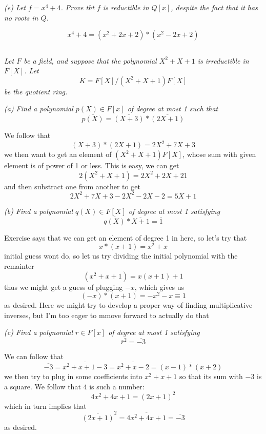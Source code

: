 \documentclass[11pt,oneside,titlepage]{book}
\begin{document}
\textit{(e) Let $f = x^4 + 4$. Prove tht $f$ is reductible in $Q[x]$,
  despite the fact that it has no roots in $Q$.}

$$x^4 + 4 = (x^2 + 2x + 2) * (x^2 - 2x + 2)$$

\subsection{}

\textit{Let $F$ be a field, and suppose that the polynomial $X^2 + X
  + 1$ is irreductible in $F[X]$. Let
  $$K = F[X] / (X^2 + X + 1)F[X]$$
  be the quotient ring.}

\textit{(a) Find a polynomial $p(X) \in F[x]$ of degree at most 1 such that
  $$\overline{p(X)} = \overline{(X + 3)} * \overline{(2X + 1)}$$
}

We follow that
$$(X + 3) * (2X + 1) = 2X^2 + 7X + 3$$
we then want to get an element of $(X^2 + X + 1)F[X]$,
whose sum with given element is of power of 1 or less. This is easy,
we can get
$$2(X^2 + X + 1) = 2X^2 + 2X + 21$$
and then substract one from another to get
$$2X^2 + 7X + 3 - 2X^2 - 2X - 2 = 5X + 1$$

\textit{(b) Find a polynomial $q(X) \in F[X]$ of degree at most 1 satisfying
  $$\overline{q(X)} * \overline{X + 1} = \overline{1}$$
}

Exercise says that we can get an element of degree 1 in here, so let's
try that
$$x * (x + 1) = x^2  + x$$
initial guess wont do, so let us try dividing the initial polynomial
with the remainter
$$(x^2 + x + 1) = x(x + 1) + 1$$
thus we might get a guess of plugging $-x$, which gives us
$$(-x) * (x + 1) = -x^2 - x \equiv 1$$
as desired. Here we might try to develop a proper way of finding
multiplicative inverses, but I'm too eager to mmove forward to
actually do that


\textit{(c) Find a polynomial $r \in F[x]$ of degree at most 1 satisfying
  $$\overline{r}^2 = \overline{- 3}$$
}

We can follow that
$$\overline{- 3} = \overline{x^2 + x + 1 - 3} =
\overline{x^2 + x - 2} = \overline{(x - 1) * (x + 2)}$$
we then try to plug in some coefficients into $x^2 + x + 1$
so that its sum with $-3$ is a square. We follow that
$4$ is such a number:
$$4x^2 + 4x + 1 = (2x + 1)^2$$
which in turn implies that
$$\overline{(2x + 1)}^2 = \overline{4x^2 + 4x + 1} = \overline{-3}$$
as desired.

\subsection{}
\end{document}
